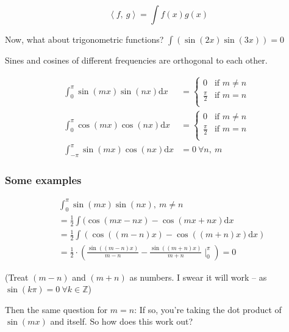 \documentclass[12pt]{article}
\theoremstyle{plain}
\theoremstyle{remark}
\theoremstyle{definition}
\begin{document}
\[\left\langle f,\ g \right\rangle = \int f(x)g(x)\]

Now, what about trigonometric functions?
\(\int\left( \sin(2x)\sin(3x) \right) = 0\)

Sines and cosines of different frequencies are orthogonal to each other.

\begin{align*}
\int_{0}^{\pi}{\sin\left( mx \right)\sin\left( nx \right)\text{d}x} &= \left\{ \begin{matrix}0 & \text{if\ }m \neq n \\\frac{\pi}{2} & \text{if\ }m = n \\\end{matrix} \right.\  \\
\int_{0}^{\pi}{\cos\left( mx \right)\cos\left( nx \right)\text{d}x} &= \left\{ \begin{matrix}0 & \text{if\ }m \neq n \\\frac{\pi}{2} & \text{if\ }m = n \\\end{matrix} \right.\ \  \\
\int_{- \pi}^{\pi}{\sin\left( mx \right)\cos\left( nx \right)\text{d}x} &= 0\ \forall n,\ m
\end{align*}



\subsubsection{Some examples}

\begin{align*}
&\int_{0}^{\pi}{\sin\left( mx \right)\sin\left( nx \right),\ m \neq n} \\
&= \frac{1}{2}\int(\cos(mx - nx) - \cos(mx + nx)\text{d}x \\
&= \frac{1}{2}\int\left( \cos\left( (m - n)x \right) - \cos\left( (m + n)x \right)\text{d}x \right) \\
&= \frac{1}{2} \cdot \left( \frac{\sin\left( (m - n)x \right)}{m - n} - \frac{\sin\left( (m + n)x \right)}{m + n} \mid_{0}^{\pi} \right) = 0
\end{align*}


(Treat \((m - n)\) and \((m + n)\) as numbers. I swear it will work --
as \(\sin\left( k\pi  \right) = 0\ \forall k\mathbb{\in Z}\))

Then the same question for \(m = n\): If so, you're taking the dot
product of \(\sin\left( mx \right)\) and itself. So how does this
work out?
\end{document}
